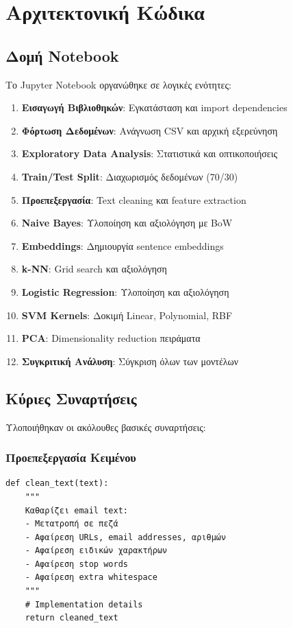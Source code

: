 \documentclass[12pt,a4paper,twoside]{book}
\begin{document}
\section{Αρχιτεκτονική Κώδικα}

\subsection{Δομή Notebook}

Το Jupyter Notebook οργανώθηκε σε λογικές ενότητες:

\begin{enumerate}
    \item \textbf{Εισαγωγή Βιβλιοθηκών}: Εγκατάσταση και import dependencies
    \item \textbf{Φόρτωση Δεδομένων}: Ανάγνωση CSV και αρχική εξερεύνηση
    \item \textbf{Exploratory Data Analysis}: Στατιστικά και οπτικοποιήσεις
    \item \textbf{Train/Test Split}: Διαχωρισμός δεδομένων (70/30)
    \item \textbf{Προεπεξεργασία}: Text cleaning και feature extraction
    \item \textbf{Naive Bayes}: Υλοποίηση και αξιολόγηση με BoW
    \item \textbf{Embeddings}: Δημιουργία sentence embeddings
    \item \textbf{k-NN}: Grid search και αξιολόγηση
    \item \textbf{Logistic Regression}: Υλοποίηση και αξιολόγηση
    \item \textbf{SVM Kernels}: Δοκιμή Linear, Polynomial, RBF
    \item \textbf{PCA}: Dimensionality reduction πειράματα
    \item \textbf{Συγκριτική Ανάλυση}: Σύγκριση όλων των μοντέλων
\end{enumerate}

\subsection{Κύριες Συναρτήσεις}

Υλοποιήθηκαν οι ακόλουθες βασικές συναρτήσεις:

\subsubsection{Προεπεξεργασία Κειμένου}

\begin{tcolorbox}[myCustomStyle={Text Cleaning Function}]
    \begin{lstlisting}[style=myPythonStyle]
def clean_text(text):
    """
    Καθαρίζει email text:
    - Μετατροπή σε πεζά
    - Αφαίρεση URLs, email addresses, αριθμών
    - Αφαίρεση ειδικών χαρακτήρων
    - Αφαίρεση stop words
    - Αφαίρεση extra whitespace
    """
    # Implementation details
    return cleaned_text
\end{lstlisting}
\end{tcolorbox}
\end{document}

